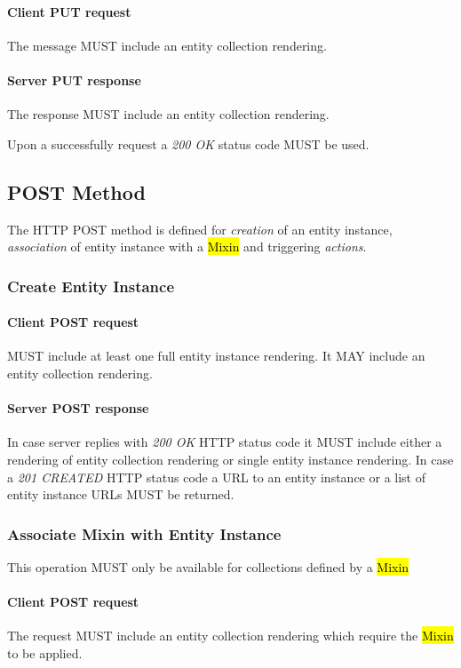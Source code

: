 \documentclass[10pt,a4paper]{article}
\begin{document}
\paragraph{Client PUT request}
The message MUST include an entity collection rendering.

\paragraph{Server PUT response}
The response MUST include an entity collection rendering.

Upon a successfully request a \emph{200 OK} status code MUST be used.

\subsection{POST Method}
The HTTP POST method is defined for {\em creation} of an entity instance, {\em association} of entity instance with a \hl{Mixin} and triggering {\em actions}.

\subsubsection{Create Entity Instance}

\paragraph{Client POST request}
MUST include at least one full entity instance rendering. It MAY include an entity collection rendering.

\paragraph{Server POST response}
In case server replies with \emph{200 OK} HTTP status code it MUST include either a rendering of entity collection rendering or single entity instance rendering. In case a \emph{201 CREATED} HTTP status code a URL to an entity instance or a list of entity instance URLs MUST be returned.

\subsubsection{Associate Mixin with Entity Instance}
This operation MUST only be available for collections defined by a \hl{Mixin}

\paragraph{Client POST request}
The request MUST include an entity collection rendering which require the \hl{Mixin} to be applied.
\end{document}
